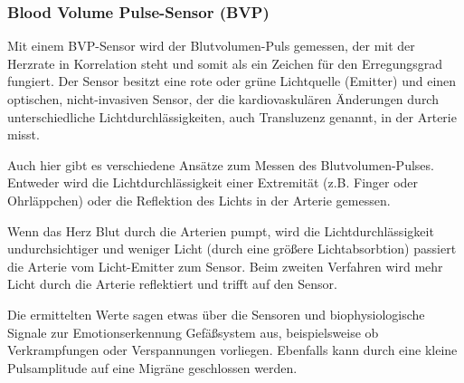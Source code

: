 \subsubsection{Blood Volume Pulse-Sensor (BVP)} \label{grund-bvp-subsubsec}


Mit einem BVP-Sensor wird der Blutvolumen-Puls gemessen, der mit der Herzrate in Korrelation
steht und somit als ein Zeichen für den Erregungsgrad fungiert. Der Sensor besitzt
eine rote oder grüne Lichtquelle (Emitter) und einen optischen, nicht-invasiven Sensor, der
die kardiovaskulären Änderungen durch unterschiedliche Lichtdurchlässigkeiten, auch Transluzenz
genannt, in der Arterie misst. 

Auch hier gibt es verschiedene Ansätze zum Messen des Blutvolumen-Pulses. Entweder wird die Lichtdurchlässigkeit einer Extremität (z.B. Finger oder Ohrläppchen) oder die Reflektion des Lichts in der Arterie gemessen. 

Wenn das Herz Blut durch die Arterien pumpt, wird die Lichtdurchlässigkeit undurchsichtiger und weniger Licht (durch eine größere Lichtabsorbtion) passiert die Arterie vom Licht-Emitter zum Sensor. Beim zweiten Verfahren wird mehr Licht durch die Arterie reflektiert
und trifft auf den Sensor.

Die ermittelten Werte sagen etwas über die Sensoren und biophysiologische Signale zur Emotionserkennung Gefäßsystem aus, beispielsweise ob Verkrampfungen oder Verspannungen vorliegen. Ebenfalls kann durch eine kleine Pulsamplitude auf eine Migräne geschlossen werden.